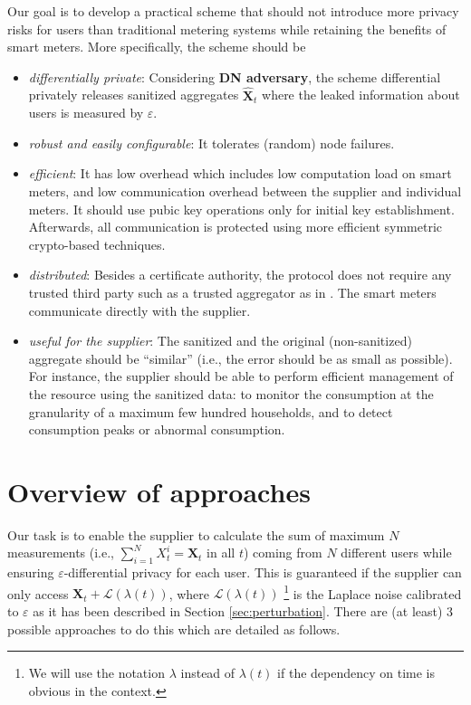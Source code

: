 \documentclass[11pt,a4paper]{article}
\theoremstyle{plain}
\theoremstyle{plain}
\theoremstyle{plain}
\theoremstyle{plain}
\theoremstyle{nonumberplain} \theoremseparator{}
\begin{document}
Our goal is to develop a practical scheme that should not introduce more privacy risks
for users than traditional metering systems while retaining the benefits of smart meters. More specifically, the scheme should be
\begin{itemize}
\item \emph{differentially private}:  Considering \textbf{DN adversary}, the scheme differential privately releases sanitized aggregates $\hat{\mathbf{X}}_{t}$ where the leaked information about users is measured by $\varepsilon$.
\item \emph{robust and easily configurable}: It tolerates (random) node failures.
\item \emph{efficient}: It has low overhead which includes low computation load on smart meters, and low communication overhead between the supplier and individual meters. It should use pubic key operations only for initial key establishment. Afterwards, all communication is protected using more efficient symmetric crypto-based techniques. 
\item \emph{distributed}: Besides a certificate authority, the protocol does not require any trusted third party such as a trusted aggregator as in \cite{bohli10icc}. The smart meters communicate directly with the supplier.
\item \emph{useful for the supplier}: The
sanitized and the original (non-sanitized) aggregate should be ``similar'' (i.e., the error should be as small as possible). For instance, the supplier should be able to perform efficient management of the resource using the sanitized data: to monitor the consumption
at the granularity of a maximum few hundred households, and to detect consumption peaks or abnormal consumption. 
\end{itemize}


\section{Overview of approaches}


Our task is to enable the supplier to calculate the sum of maximum $N$ measurements (i.e., $\sum_{i=1}^N X_{t}^{i} = \mathbf{X}_{t}$ in all $t$) coming from $N$ different
users while ensuring $\varepsilon$-differential privacy for each user. 
This is guaranteed if the supplier can only access $\mathbf{X}_{t} + \mathcal{L}(\lambda(t))$, where $\mathcal{L}(\lambda(t))$ \footnote{We will use the notation $\lambda$ instead of $\lambda(t)$ if the dependency on time is obvious in the context.} is the Laplace noise calibrated to $\varepsilon$ as it has been described in Section \ref{sec:perturbation}. There are (at least) 3 possible approaches to do this which are detailed as follows.
\end{document}
